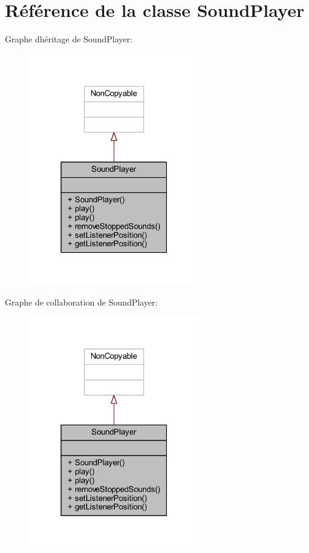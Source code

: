 \hypertarget{class_sound_player}{}\section{Référence de la classe Sound\+Player}
\label{class_sound_player}


Graphe d\textquotesingle{}héritage de Sound\+Player\+:\nopagebreak
\begin{figure}[H]
\begin{center}
\leavevmode
\includegraphics[width=211pt]{class_sound_player__inherit__graph}
\end{center}
\end{figure}


Graphe de collaboration de Sound\+Player\+:\nopagebreak
\begin{figure}[H]
\begin{center}
\leavevmode
\includegraphics[width=211pt]{class_sound_player__coll__graph}
\end{center}
\end{figure}
